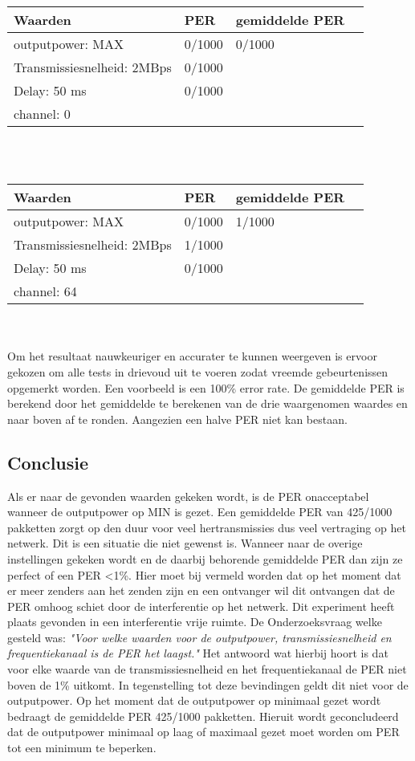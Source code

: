 \documentclass{article}
\begin{document}
    \begin{tabular}{ | l | l | l | p{5cm} |}
    \hline
    Waarden & PER & gemiddelde PER\\ \hline
    outputpower: MAX & 0/1000 &  0/1000\\ \hline
    Transmissiesnelheid: 2MBps & 0/1000 &   \\ \hline
    Delay: 50 ms & 0/1000 &  \\
    \hline
    channel: 0 &  &  \\ \hline
    \end{tabular}\\
    \\
    
    \begin{tabular}{ | l | l | l | p{5cm} |}
    \hline
    Waarden & PER & gemiddelde PER\\ \hline
    outputpower: MAX & 0/1000 & 1/1000\\ \hline
    Transmissiesnelheid: 2MBps & 1/1000 &  \\ \hline
    Delay: 50 ms & 0/1000 &  \\
    \hline
    channel: 64 &  &  \\ \hline
    \end{tabular}\\
    \\

Om het resultaat nauwkeuriger en accurater te kunnen weergeven is ervoor gekozen om alle tests in drievoud uit te voeren zodat vreemde gebeurtenissen opgemerkt worden. Een voorbeeld is een 100\% error rate.
\newline 
De gemiddelde PER is berekend door het gemiddelde te berekenen van de drie waargenomen waardes en naar boven af te ronden. Aangezien een halve PER niet kan bestaan. 

\subsection{Conclusie}
Als er naar de gevonden waarden gekeken wordt, is de PER onacceptabel wanneer de outputpower op MIN is gezet. Een gemiddelde PER van 425/1000 pakketten zorgt op den duur voor veel hertransmissies dus veel vertraging op het netwerk. Dit is een situatie die niet gewenst is. Wanneer naar de overige instellingen gekeken wordt en de daarbij behorende gemiddelde PER dan zijn ze perfect of een PER <1\%. Hier moet bij vermeld worden dat op het moment dat er meer zenders aan het zenden zijn en een ontvanger wil dit ontvangen dat de PER omhoog schiet door de interferentie op het netwerk. Dit experiment heeft plaats gevonden in een interferentie vrije ruimte.
De Onderzoeksvraag welke gesteld was: \textit{"Voor welke waarden voor de outputpower, transmissiesnelheid en frequentiekanaal is de PER het laagst."} Het antwoord wat hierbij hoort is dat voor elke waarde van de transmissiesnelheid en het frequentiekanaal de PER niet boven de 1\% uitkomt. In tegenstelling tot deze bevindingen geldt dit niet voor de outputpower. Op het moment dat de outputpower op minimaal gezet wordt bedraagt de gemiddelde PER 425/1000 pakketten. Hieruit wordt geconcludeerd dat de outputpower minimaal op laag of maximaal gezet moet worden om PER tot een minimum te beperken. 
\end{document}
